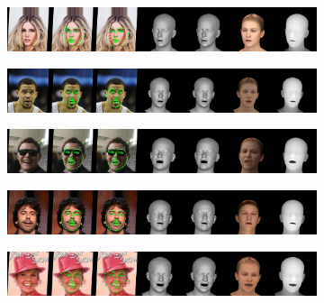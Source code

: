 \documentclass[12pt,a4]{article}
\begin{document}
            \begin{figure}[htb]
                \centering

                \begin{subfigure}[b]{1\textwidth}
                   \includegraphics[width=1\linewidth]{test0019_vis.jpg}
                \end{subfigure}

                \begin{subfigure}[b]{1\textwidth}
                   \includegraphics[width=1\linewidth]{test0021_vis.jpg}
                \end{subfigure}

                \begin{subfigure}[b]{1\textwidth}
                   \includegraphics[width=1\linewidth]{test0023_vis.jpg}
                \end{subfigure}

                \begin{subfigure}[b]{1\textwidth}
                   \includegraphics[width=1\linewidth]{test0027_vis.jpg}
                \end{subfigure}

                \begin{subfigure}[b]{1\textwidth}
                   \includegraphics[width=1\linewidth]{test0029_vis.jpg}
                \end{subfigure}


\end{figure}
\end{document}
